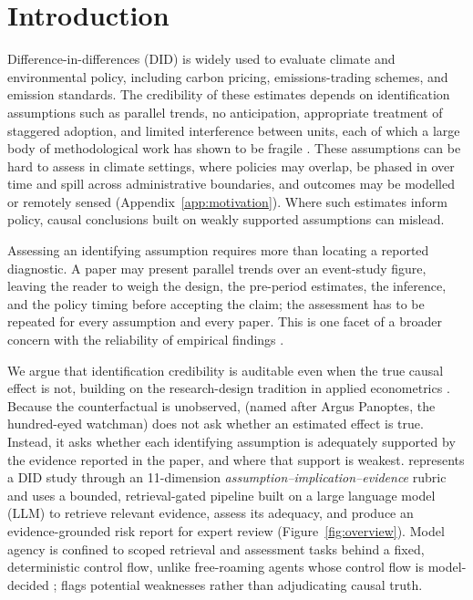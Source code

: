 \section{Introduction}
\label{sec:intro}

Difference-in-differences (DID) is widely used to evaluate climate and
environmental policy, including carbon pricing, emissions-trading schemes, and
emission standards. The credibility of these estimates depends on identification
assumptions such as parallel trends, no anticipation, appropriate treatment of
staggered adoption, and limited interference between units, each of which a large
body of methodological work has shown to be fragile
\cite{goodmanbacon2021,callaway2021,sunabraham2021,dechaisemartin2020,roth2023}.
These assumptions can be hard to assess in climate settings, where policies may
overlap, be phased in over time and spill across administrative boundaries,
and outcomes may be modelled or remotely sensed (Appendix~\ref{app:motivation}).
Where such estimates inform policy, causal conclusions built on weakly
supported assumptions can mislead.

Assessing an identifying assumption requires more than locating a reported
diagnostic. A paper may present parallel trends over an event-study figure,
leaving the reader to weigh the design, the pre-period estimates, the
inference, and the policy timing before accepting the claim; the assessment
has to be repeated for every assumption and every paper. This is one facet of a
broader concern with the reliability of empirical findings
\cite{ioannidis2005,silberzahn2018many,brodeur2020methods}.

We argue that identification credibility is auditable even when the true causal
effect is not, building on the research-design tradition in applied econometrics
\cite{angristpischke2010,atheyimbens2017,rambachanroth2023}. Because the
counterfactual is unobserved, \sys{} (named after Argus Panoptes, the
hundred-eyed watchman) does not ask whether an estimated effect is true. Instead, it asks whether each identifying
assumption is adequately supported by the evidence reported in the paper, and where
that support is weakest. \sys{} represents a DID study through an 11-dimension
\emph{assumption--implication--evidence} rubric and uses a bounded,
retrieval-gated pipeline built on a large language model (LLM) to retrieve
relevant evidence, assess its adequacy, and produce an evidence-grounded risk
report for expert review (Figure~\ref{fig:overview}). Model agency is confined
to scoped retrieval and assessment tasks behind a fixed, deterministic control flow,
unlike free-roaming agents whose control flow is model-decided \cite{yao2023react};
\sys{} flags potential weaknesses rather than adjudicating causal truth.

